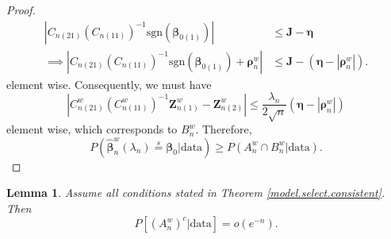 \documentclass[12pt]{article}
\newcommand{\bnw}{\widehat{\bm{\beta}}_n^w} %
\newcommand{\be}{\bm{\beta}} %
\newcommand{\cnwa}{C_{n(11)}^w}
\newcommand{\cnwc}{C_{n(21)}^w}
\newcommand{\znwa}{\bm{Z}_{n(1)}^w}
\newcommand{\znwb}{\bm{Z}_{n(2)}^w}
\newtheorem{lem}{Lemma}[section]
\begin{document}
\begin{proof}
	\begin{align*}
		\left|
			C_{n(21)} \left( C_{n(11)} \right)^{-1} 
			\text{sgn} \left( \be_{0(1)} \right)
		\right| &\leq
		\bm{J} - \bm{\eta} \\
		\implies 
		\left|
			C_{n(21)} \left( C_{n(11)} \right)^{-1} 
			\text{sgn} \left( \be_{0(1)} \right)
			+ \bm{\rho}_n^w
		\right|
		&\leq \bm{J} 
		- \left(
		  		\bm{\eta}  - \left| \bm{\rho}_n^w \right|
		  \right).
	\end{align*} 
	element wise. Consequently, we must have
	$$
	\left|
		\cnwc \left( \cnwa \right)^{-1} \znwa - \znwb 
	\right| 
	\leq \dfrac{\lambda_n}{2 \sqrt{n}}
	\left(
		\bm{\eta} 
		- \left| \bm{\rho}_n^w \right| 
	\right)
	$$
	element wise, which corresponds to $B_n^w$. Therefore, 
	$$
	P\left(
			\bnw (\lambda_n) \stackrel{s}{=} \be_0
			\bigg| \text{data}
	  \right)	
	\geq P \left( 
				A_n^w \cap B_n^w 
				\big| \text{data}
			\right).
	$$ 
\end{proof}

\begin{lem} \label{lem_Anwc}
	Assume all conditions stated in Theorem \ref{model.select.consistent}. Then
	$$
	P \left[	
			\left( A_n^w  \right)^c
			\big| \text{data}
	\right]
	= o \left( e^{-n} \right).
	$$
\end{lem}
\end{document}
